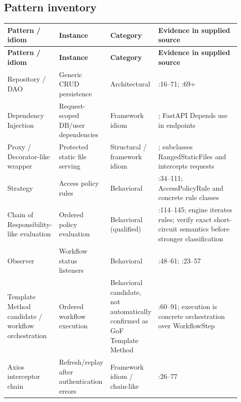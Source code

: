 \documentclass[11pt,a4paper]{article}
\begin{document}
\subsection{Pattern inventory}
\small
\begin{longtable}{@{}L{0.19\linewidth}L{0.2\linewidth}L{0.18\linewidth}L{0.37\linewidth}@{}}
\toprule
\textbf{Pattern / idiom} & \textbf{Instance} & \textbf{Category} & \textbf{Evidence in supplied source}\\
\midrule\endfirsthead
\toprule
\textbf{Pattern / idiom} & \textbf{Instance} & \textbf{Category} & \textbf{Evidence in supplied source}\\
\midrule\endhead
\bottomrule\endfoot
Repository / DAO & Generic CRUD persistence & Architectural & :16--71; :69+\\
Dependency Injection & Request-scoped DB/user dependencies & Framework idiom & ; FastAPI Depends use in endpoints\\
Proxy / Decorator-like wrapper & Protected static file serving & Structural / framework idiom & ; subclasses RangedStaticFiles and intercepts requests\\
Strategy & Access policy rules & Behavioral & :34--111; AccessPolicyRule and concrete rule classes\\
Chain of Responsibility-like evaluation & Ordered policy evaluation & Behavioral (qualified) & :114--145; engine iterates rules; verify exact short-circuit semantics before stronger classification\\
Observer & Workflow status listeners & Behavioral & :48--61; :23--57\\
Template Method candidate / workflow orchestration & Ordered workflow execution & Behavioral candidate, not automatically confirmed as GoF Template Method & :60--91; execution is concrete orchestration over WorkflowStep\\
Axios interceptor chain & Refresh/replay after authentication errors & Framework idiom / chain-like & :26--77\\
\end{longtable}
\normalsize
\end{document}
